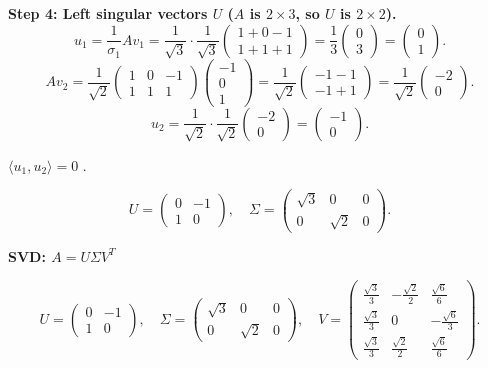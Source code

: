 \documentclass[12pt,a3paper]{article}
\begin{document}
\begin{tcolorbox}
\textbf{Step 4: Left singular vectors $U$ ($A$ is $2\times3$, so $U$ is $2\times2$).}
\[
u_1 = \frac{1}{\sigma_1}Av_1 = \frac{1}{\sqrt{3}}\cdot\frac{1}{\sqrt{3}}\begin{pmatrix}1+0-1\\1+1+1\end{pmatrix}
= \frac{1}{3}\begin{pmatrix}0\\3\end{pmatrix} = \begin{pmatrix}0\\1\end{pmatrix}.
\]
\[
Av_2 = \frac{1}{\sqrt{2}}\begin{pmatrix}1&0&-1\\1&1&1\end{pmatrix}\begin{pmatrix}-1\\0\\1\end{pmatrix}
= \frac{1}{\sqrt{2}}\begin{pmatrix}-1-1\\-1+1\end{pmatrix}
= \frac{1}{\sqrt{2}}\begin{pmatrix}-2\\0\end{pmatrix}.
\]
\[
u_2 = \frac{1}{\sqrt{2}}\cdot\frac{1}{\sqrt{2}}\begin{pmatrix}-2\\0\end{pmatrix} = \begin{pmatrix}-1\\0\end{pmatrix}.
\]
 
$\langle u_1,u_2\rangle = 0$ \checkmark.
 
\[
U = \begin{pmatrix}0&-1\\1&0\end{pmatrix},\quad\Sigma=\begin{pmatrix}\sqrt{3}&0&0\\0&\sqrt{2}&0\end{pmatrix}.
\]
 
\textbf{SVD: $A = U\Sigma V^T$}
 
\[
U = \begin{pmatrix}0&-1\\1&0\end{pmatrix},\quad
\Sigma = \begin{pmatrix}\sqrt{3}&0&0\\0&\sqrt{2}&0\end{pmatrix},\quad
V = \begin{pmatrix}\frac{\sqrt{3}}{3}&-\frac{\sqrt{2}}{2}&\frac{\sqrt{6}}{6}\\[3pt]\frac{\sqrt{3}}{3}&0&-\frac{\sqrt{6}}{3}\\[3pt]\frac{\sqrt{3}}{3}&\frac{\sqrt{2}}{2}&\frac{\sqrt{6}}{6}\end{pmatrix}.
\]
 

\end{tcolorbox}
\end{document}
